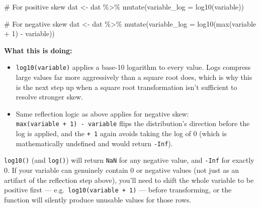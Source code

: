 \documentclass[
  letterpaper,
  DIV=11,
  numbers=noendperiod]{scrreprt}
\newenvironment{Shaded}{\begin{snugshade}}{\end{snugshade}}
\newcommand{\AttributeTok}[1]{\textcolor[rgb]{0.40,0.45,0.13}{#1}}
\newcommand{\CommentTok}[1]{\textcolor[rgb]{0.37,0.37,0.37}{#1}}
\newcommand{\DecValTok}[1]{\textcolor[rgb]{0.68,0.00,0.00}{#1}}
\newcommand{\FunctionTok}[1]{\textcolor[rgb]{0.28,0.35,0.67}{#1}}
\newcommand{\NormalTok}[1]{\textcolor[rgb]{0.00,0.23,0.31}{#1}}
\newcommand{\OtherTok}[1]{\textcolor[rgb]{0.00,0.23,0.31}{#1}}
\newcommand{\SpecialCharTok}[1]{\textcolor[rgb]{0.37,0.37,0.37}{#1}}
\begin{document}
\begin{Shaded}
\begin{Highlighting}[]
\CommentTok{\# For positive skew}
\NormalTok{dat }\OtherTok{\textless{}{-}}\NormalTok{ dat }\SpecialCharTok{\%\textgreater{}\%}
  \FunctionTok{mutate}\NormalTok{(}\AttributeTok{variable\_log =} \FunctionTok{log10}\NormalTok{(variable))}

\CommentTok{\# For negative skew}
\NormalTok{dat }\OtherTok{\textless{}{-}}\NormalTok{ dat }\SpecialCharTok{\%\textgreater{}\%}
  \FunctionTok{mutate}\NormalTok{(}\AttributeTok{variable\_log =} \FunctionTok{log10}\NormalTok{(}\FunctionTok{max}\NormalTok{(variable }\SpecialCharTok{+} \DecValTok{1}\NormalTok{) }\SpecialCharTok{{-}}\NormalTok{ variable))}
\end{Highlighting}
\end{Shaded}

\textbf{What this is doing:}

\begin{itemize}
\item
  \texttt{log10(variable)} applies a base-10 logarithm to every value.
  Logs compress large values far more aggressively than a square root
  does, which is why this is the next step up when a square root
  transformation isn't sufficient to resolve stronger skew.
\item
  Same reflection logic as above applies for negative skew:
  \texttt{max(variable\ +\ 1)\ -\ variable} flips the distribution's
  direction before the log is applied, and the \texttt{+\ 1} again
  avoids taking the log of 0 (which is mathematically undefined and
  would return \texttt{-Inf}).
\end{itemize}

\begin{tcolorbox}[enhanced jigsaw, toprule=.15mm, coltitle=black, colframe=quarto-callout-warning-color-frame, colbacktitle=quarto-callout-warning-color!10!white, opacityback=0, left=2mm, breakable, rightrule=.15mm, bottomrule=.15mm, leftrule=.75mm, titlerule=0mm, arc=.35mm, opacitybacktitle=0.6, toptitle=1mm, bottomtitle=1mm, title=\textcolor{quarto-callout-warning-color}{\faExclamationTriangle}\hspace{0.5em}{Warning}, colback=white]

\texttt{log10()} (and \texttt{log()}) will return \texttt{NaN} for any
negative value, and \texttt{-Inf} for exactly 0. If your variable can
genuinely contain 0 or negative values (not just as an artifact of the
reflection step above), you'll need to shift the whole variable to be
positive first --- e.g.~\texttt{log10(variable\ +\ 1)} --- before
transforming, or the function will silently produce unusable values for
those rows.

\end{tcolorbox}
\end{document}

